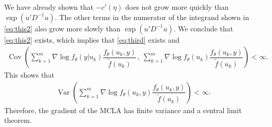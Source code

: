 \documentclass{article}
\DeclareMathOperator{\var}{Var}
\DeclareMathOperator{\cov}{Cov}
\begin{document}
We have already shown that $-c'(\eta)$ does not grow more quickly than $\exp(u'D^{-1}u)$. The other terms in the numerator of the integrand shown in \eqref{eq:this2} also grow more slowly than $\exp(u'D^{-1}u)$. We conclude that \eqref{eq:this2} exists, which implies that \eqref{eq:third} exists and
\begin{align}
\cov \left(\sum_{k=1}^m \nabla \log f_\theta (y|u_k) \dfrac{f_\theta(u_k,y)}{\tilde{f}(u_k)} \, , \, \sum_{k=1}^m \nabla \log f_\theta (u_k) \dfrac{f_\theta(u_k,y)}{\tilde{f}(u_k)} \right) < \infty.
\end{align}
This shows that
\begin{align}
\var \left( \sum_{k=1}^m     \nabla \log f_\theta(u_k,y)\dfrac{f_\theta(u_k,y)}{\tilde{f}(u_k)} \right) < \infty. 
\end{align}
Therefore, the gradient of the MCLA has finite variance and a central limit theorem.
\end{document}
